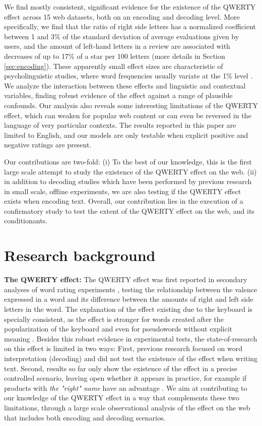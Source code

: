 \documentclass[letterpaper]{sig-alternate-2013}
\begin{document}
We find mostly consistent, significant evidence for the existence of the
QWERTY effect across 15 web datasets, both on an encoding and decoding level.
More specifically, we find that the ratio of right side letters has a
normalized coefficient between 1 and 3\% of the standard deviation of average
evaluations given by users, and the amount of left-hand letters in a review
are associated with decreases of up to 17\% of a star per 100 letters (more
details in Section \ref{sec:encoding}). These apparently small effect sizes
are characteristic of psycholinguistic studies, where word frequencies usually
variate at the 1\% level \cite{Golder2011,Kramer2014}.  We analyze the
interaction between these effects and linguistic and contextual variables,
finding robust evidence of the effect against a range of plausible confounds.
Our analysis also reveals some interesting limitations of the QWERTY effect,
which can weaken for popular web content or can even be reversed in the
language of very particular contexts. The results reported in this paper are
limited to English, and our models are only testable when explicit positive
and negative ratings are present.

Our contributions are two-fold: (i) To the best of our knowledge, this is the
first large scale attempt to study the existence of the QWERTY effect on the
web. (ii) in addition to decoding studies which have been performed by
previous research in small scale, offline experiments, we are also testing if the QWERTY effect exists when
encoding text. Overall, our contribution lies in the execution of a confirmatory study to
test the extent of the QWERTY effect on the web, and its conditionants.

\section{Research background}


\textbf{The QWERTY effect:} The QWERTY effect was first reported in secondary
analyses of word rating experiments \cite{Jasmin2012}, testing the
relationship between the valence expressed in a word and its difference
between the amounts of right and left side letters in the word. The
explanation of the effect existing due to the keyboard is specially
consistent, as the effect is stronger for words created after the
popularization of the keyboard and even for pseudowords without explicit
meaning \cite{Casasanto2014}. Besides this robust evidence in experimental
tests, the state-of-research on this effect is limited in two ways: First,
previous research focused on word interpretation (decoding) and did not test
the existence of the effect when writing text. Second, results so far only
show the existence of the effect in a precise controlled scenario, leaving
open whether it appears in practice, for example if products with \emph{the
"right" name} have an advantage \cite{Jasmin2012}. We aim at contributing to
our knowledge of the QWERTY effect in a way that complements these two
limitations, through a large scale observational analysis of the effect on the
web that includes both encoding and decoding scenarios.
\end{document}
